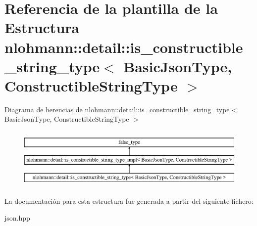 \hypertarget{structnlohmann_1_1detail_1_1is__constructible__string__type}{}\section{Referencia de la plantilla de la Estructura nlohmann\+:\+:detail\+:\+:is\+\_\+constructible\+\_\+string\+\_\+type$<$ Basic\+Json\+Type, Constructible\+String\+Type $>$}
\label{structnlohmann_1_1detail_1_1is__constructible__string__type}
Diagrama de herencias de nlohmann\+:\+:detail\+:\+:is\+\_\+constructible\+\_\+string\+\_\+type$<$ Basic\+Json\+Type, Constructible\+String\+Type $>$\begin{figure}[H]
\begin{center}
\leavevmode
\includegraphics[height=3.000000cm]{structnlohmann_1_1detail_1_1is__constructible__string__type}
\end{center}
\end{figure}


La documentación para esta estructura fue generada a partir del siguiente fichero\+:\begin{DoxyCompactItemize}
\item 
json.\+hpp\end{DoxyCompactItemize}
